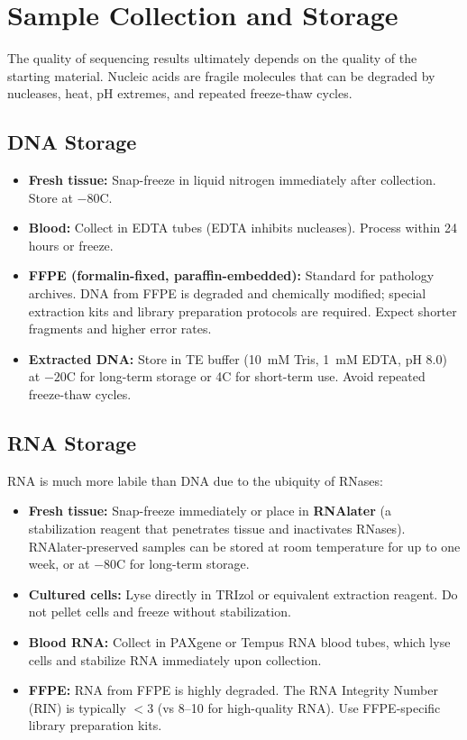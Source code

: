 \section{Sample Collection and Storage}
\label{sec:expdesign:samples}

The quality of sequencing results ultimately depends on the quality of the starting material. Nucleic acids are fragile molecules that can be degraded by nucleases, heat, pH extremes, and repeated freeze-thaw cycles.

\subsection{DNA Storage}

\begin{itemize}[itemsep=2pt]
  \item \textbf{Fresh tissue:} Snap-freeze in liquid nitrogen immediately after collection. Store at $-80$\textdegree{}C.
  \item \textbf{Blood:} Collect in EDTA tubes (EDTA inhibits nucleases). Process within 24 hours or freeze.
  \item \textbf{FFPE (formalin-fixed, paraffin-embedded):} Standard for pathology archives. DNA from FFPE is degraded and chemically modified; special extraction kits and library preparation protocols are required. Expect shorter fragments and higher error rates.
  \item \textbf{Extracted DNA:} Store in TE buffer (10~mM Tris, 1~mM EDTA, pH 8.0) at $-20$\textdegree{}C for long-term storage or 4\textdegree{}C for short-term use. Avoid repeated freeze-thaw cycles.
\end{itemize}

\subsection{RNA Storage}

RNA is much more labile than DNA due to the ubiquity of RNases:

\begin{itemize}[itemsep=2pt]
  \item \textbf{Fresh tissue:} Snap-freeze immediately or place in \textbf{RNAlater} (a stabilization reagent that penetrates tissue and inactivates RNases). RNAlater-preserved samples can be stored at room temperature for up to one week, or at $-80$\textdegree{}C for long-term storage.
  \item \textbf{Cultured cells:} Lyse directly in TRIzol or equivalent extraction reagent. Do not pellet cells and freeze without stabilization.
  \item \textbf{Blood RNA:} Collect in PAXgene or Tempus RNA blood tubes, which lyse cells and stabilize RNA immediately upon collection.
  \item \textbf{FFPE:} RNA from FFPE is highly degraded. The RNA Integrity Number (RIN) is typically $<$3 (vs 8--10 for high-quality RNA). Use FFPE-specific library preparation kits.
\end{itemize}

